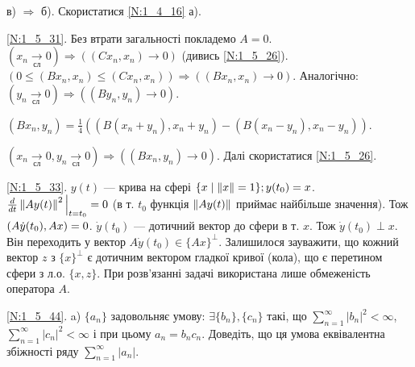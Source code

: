 \noindent в) $\Rightarrow$ б). Скористатися \ref{N:1_4_16} а).

\noindent\ref{N:1_5_31}. Без втрати загальності покладемо $A = 0$.
$(x_n \xrightarrow[\text{сл}]{} 0) \Rightarrow \left( (C x_n, x_n) \rightarrow 0 \right)$ (дивись \ref{N:1_5_26}).
$(0 \leq (B x_n , x_n) \leq (C x_n, x_n)) \Rightarrow ((B x_n, x_n) \rightarrow 0)$. Аналогічно:
$(y_n \xrightarrow[\text{сл}]{} 0) \Rightarrow ((B y_n, y_n) \rightarrow 0)$.

\noindent$(B x_n, y_n) = \frac{1}{4}\left( (B(x_n+y_n), x_n+y_n) - (B(x_n - y_n), x_n - y_n)\right)$. 

 $(x_n \xrightarrow[\text{сл}]{} 0, y_n \xrightarrow[\text{сл}]{} 0) \Rightarrow ((B x_n, y_n) \rightarrow 0)$. Далі скористатися \ref{N:1_5_26}.

\noindent\ref{N:1_5_33}.
    $y(t)$ --- крива на сфері $\{x \mid \left\lVert x\right\rVert = 1\}; y(t_0) = x$. $\frac{d}{dt} \left\lVert A y(t)\right\rVert^2 \Big|_{t = t_0} = 0$
    (в т. $t_0$ функція $\left\lVert A y(t)\right\rVert$ приймає найбільше значення). Тож $\left(A \dot{y} (t_0), A x\right) = 0$.
    $\dot{y} (t_0)$ --- дотичний вектор до сфери в т. $x$. Тож $\dot{y} (t_0) \perp x$. 
Він переходить у вектор $A \dot{y} (t_0) \in \{Ax\}^{\perp}$. Залишилося зауважити, що кожний вектор $z$ з $\{x\}^{\perp}$ є дотичним вектором
гладкої кривої (кола), що є перетином сфери з л.о. $\{x, z\}$. При розв'язанні задачі використана лише обмеженість оператора $A$.

\noindent \ref{N:1_5_44}. a) $\{a_n\}$ задовольняє умову: $\exists \{b_n\}, 
\{c_n\}$ такі, що $\sum\limits_{n=1}^{\infty}|b_n|^2 < \infty$, 
$\sum\limits_{n=1}^{\infty}|c_n|^2 < \infty$ і при цьому $a_n = b_nc_n$.
Доведіть, що ця умова еквівалентна збіжності ряду $\sum\limits_{n=1}^\infty 
|a_n|$.

